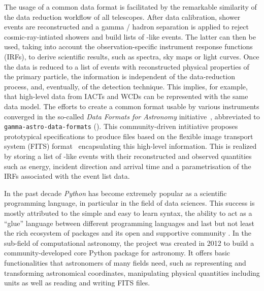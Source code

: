 \documentclass[longauth]{aa}
\begin{document}
The usage of a common data format is facilitated by the remarkable similarity of the data reduction workflow of all \gammaray telescopes.
After data calibration, shower events are reconstructed and
a gamma / hadron separation is applied to reject cosmic-ray-intiated showers and build lists of \gammaray-like events.
The latter can then be used, taking into account the observation-specific instrument response functions (IRFs),
to derive scientific results, such as spectra, sky maps or light curves.
Once the data is reduced to a list of events with reconstructed physical properties of the primary particle,
the information is independent of the data-reduction process, and, eventually, of the detection technique. This implies,
for example, that high-level data from IACTs and WCDs can be represented
with the same data model.
The efforts to create a common format usable by various instruments
converged in the so-called \textit{Data Formats for \gammaray Astronomy}
initiative~\citep{gadf_proc,gadf_universe}, abbreviated to
\texttt{gamma-astro-data-formats} (\gadf). This community-driven intitiative proposes prototypical
specifications to produce files based on the flexible image transport system
(FITS) format~\citep{fits} encapsulating this high-level information. This is
realized by storing a list of \gammaray-like events with their reconstructed and observed
quantities such as energy, incident direction and arrival time and a parametrisation of
the IRFs associated with the event list data. %

In the past decade \textit{Python} has become extremely popular as a scientific programming language,
in particular in the field of data sciences. This success is
mostly attributed to the simple and easy to learn syntax, the ability to act as
a \enquote{glue} language between different programming languages and last but not least
the rich ecosystem of packages and its open and supportive community \citep{Momcheva2015}.
In the sub-field of computational astronomy, the \astropy project \citep{astropy} was created in 2012
to build a community-developed core Python package for astronomy.
It offers basic functionalities that astronomers of many fields need, such as representing
and transforming astronomical coordinates, manipulating physical quantities including units
as well as reading and writing FITS files.
\end{document}
